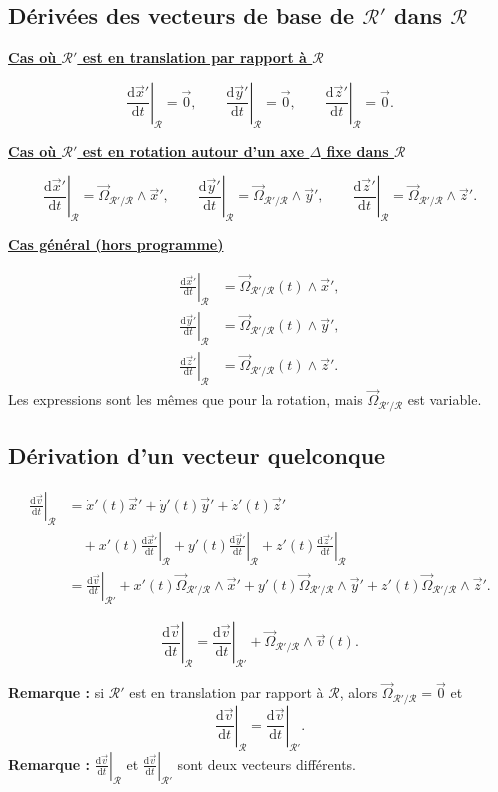\documentclass[11pt,a4paper]{article}
\newcommand{\dd}{\mathrm d}
\newcommand{\titr}[1]{\par\textbf{\underline{#1}}\par\nopagebreak[3]}
\newcommand{\etoiles}[1]{\foreach \i in {1,...,#1}{\mathord{\star}\,}}
\newcommand{\R}{\mathcal R}
\newcommand{\Om}{\vec\Omega_{\R'/\R}}
\newcommand{\D}[2]{\left.\frac{\dd #1}{\dd t}\right|_{#2}}
\begin{document}
\subsection{Dérivées des vecteurs de base de $\R'$ dans $\R$}
\titr{Cas où $\R'$ est en translation par rapport à $\R$}
\[\D{\vec x'}{\R}=\vec0,\qquad\D{\vec y'}{\R}=\vec0,\qquad\D{\vec z'}{\R}=\vec0.\]
\titr{Cas où $\R'$ est en rotation autour d'un axe $\Delta$ fixe dans $\R$}
\[\D{\vec x'}{\R}=\Om\wedge\vec x',\qquad
\D{\vec y'}{\R}=\Om\wedge\vec y',\qquad
\D{\vec z'}{\R}=\Om\wedge\vec z'.\]
\titr{Cas général (hors programme)}
\[\begin{aligned}
\D{\vec x'}{\R}&=\Om(t)\wedge\vec x',\\
\D{\vec y'}{\R}&=\Om(t)\wedge\vec y',\\
\D{\vec z'}{\R}&=\Om(t)\wedge\vec z'.
\end{aligned}\]
Les expressions sont les mêmes que pour la rotation, mais $\Om$ est variable.
\subsection{Dérivation d'un vecteur quelconque}
\begin{align*}
\D{\vec v}{\R}
&=\dot x'(t)\vec x'+\dot y'(t)\vec y'+\dot z'(t)\vec z'\\
&\quad+x'(t)\D{\vec x'}{\R}+y'(t)\D{\vec y'}{\R}+z'(t)\D{\vec z'}{\R}\\
&=\D{\vec v}{\R'}+x'(t)\Om\wedge\vec x'
+y'(t)\Om\wedge\vec y'+z'(t)\Om\wedge\vec z'.
\end{align*}
\begin{cadre}[etoiles={\etoiles{2}}]
\[\D{\vec v}{\R}=\D{\vec v}{\R'}+\Om\wedge\vec v(t).\]
\end{cadre}
\textbf{Remarque :} si $\R'$ est en translation par rapport à $\R$, alors $\Om=\vec0$ et
\[\D{\vec v}{\R}=\D{\vec v}{\R'}.\]
\textbf{Remarque :} $\D{\vec v}{\R}$ et $\D{\vec v}{\R'}$ sont deux vecteurs différents.
\end{document}
